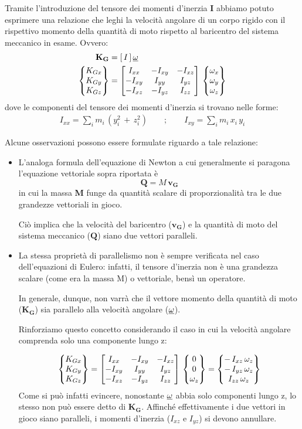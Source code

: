 	Tramite l'introduzione del tensore dei momenti d'inerzia $\mathbf{\mathbf{I}}$ abbiamo potuto esprimere una relazione che leghi la velocità angolare di un corpo rigido con il rispettivo momento della quantità di moto rispetto al baricentro del sistema meccanico in esame. Ovvero:
	\begin{align*}
	\mathbf{K_G} &= [\,I\,]\,\underline{\omega} \\
	\begin{Bmatrix}K_{Gx}\\K_{Gy}\\K_{Gz}\end{Bmatrix} &= \begin{bmatrix}I_{xx}&-I_{xy}&-I_{xz}\\-I_{xy}&I_{yy}&I_{yz}\\-I_{xz}&-I_{yz}&I_{zz}\end{bmatrix}\,\begin{Bmatrix}\omega_x\\\omega_y\\\omega_z\end{Bmatrix}
\end{align*}
	dove le componenti del tensore dei momenti d'inerzia si trovano nelle forme:
	\begin{gather*}
	I_{xx} = \sum_i m_i\,(y_i^2\,+\,z_i^2)\qquad;\qquad I_{xy} = \sum_i m_i\,x_i\,y_i
	\end{gather*}
	
	Alcune osservazioni possono essere formulate riguardo a tale relazione:
	\begin{itemize}
	\item L'analoga formula dell'equazione di Newton a cui generalmente si paragona l'equazione vettoriale sopra riportata è
	\[\mathbf{Q} = M\,\mathbf{v_G}\]
	in cui la massa \textbf{M} funge da quantità scalare di proporzionalità tra le due grandezze vettoriali in gioco.
	
	Ciò implica che la velocità del baricentro ($\mathbf{v_G}$) e la quantità di moto del sistema meccanico ($\mathbf{Q}$) siano due vettori paralleli.
	
	\item La stessa proprietà di parallelismo non è sempre verificata nel caso dell'equazioni di Eulero: infatti, il tensore d'inerzia non è una grandezza scalare (come era la massa M) o vettoriale, bensì un operatore.
	
	In generale, dunque, non varrà che il vettore momento della quantità di moto ($\mathbf{K_G}$) sia parallelo alla velocità angolare ($\underline{\omega}$).
	
	Rinforziamo questo concetto considerando il caso in cui la velocità angolare comprenda solo una componente lungo z:
	
	\[
	\begin{Bmatrix}K_{Gx}\\K_{Gy}\\K_{Gz}\end{Bmatrix} =  \begin{bmatrix}I_{xx}&-I_{xy}&-I_{xz}\\-I_{xy}&I_{yy}&I_{yz}\\-I_{xz}&-I_{yz}&I_{zz}\end{bmatrix}\,\begin{Bmatrix}0\\0\\\omega_z\end{Bmatrix} = \begin{Bmatrix}-\,I_{xz}\,\omega_z\\-\,I_{yz}\,\omega_z\\I_{zz}\,\omega_z\end{Bmatrix} 
	\]
	Come si può infatti evincere, nonostante $\underline{\omega}$ abbia solo componenti lungo z, lo stesso non può essere detto di $\mathbf{K_G}$. Affinché effettivamente i due vettori in gioco siano paralleli, i momenti d'inerzia ($I_{xz}$ e $I_{yz}$) si devono annullare.
	\end{itemize}

